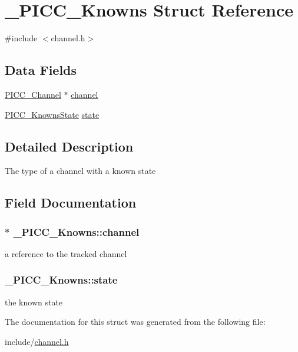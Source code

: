 \hypertarget{struct__PICC__Knowns}{\section{\-\_\-\-P\-I\-C\-C\-\_\-\-Knowns Struct Reference}
\label{struct__PICC__Knowns}
}


{\ttfamily \#include $<$channel.\-h$>$}

\subsection*{Data Fields}
{\bf }\par
\begin{DoxyCompactItemize}
\item 
\hyperlink{channel_8h_a0a70def8883f1abb8e7246b3a4c9dffb}{P\-I\-C\-C\-\_\-\-Channel} $\ast$ \hyperlink{struct__PICC__Knowns_a8e0180c667bb8d86d380fffa3473f66f}{channel}
\item 
\hyperlink{channel_8h_af0a907754143ea0a7261dccc8a9fa2db}{P\-I\-C\-C\-\_\-\-Knowns\-State} \hyperlink{struct__PICC__Knowns_add532920acff73cd540d3bf4e570f8cb}{state}
\end{DoxyCompactItemize}



\subsection{Detailed Description}
The type of a channel with a known state 

\subsection{Field Documentation}
\hypertarget{struct__PICC__Knowns_a8e0180c667bb8d86d380fffa3473f66f}{
\subsubsection[{channel}]{$\ast$ \-\_\-\-P\-I\-C\-C\-\_\-\-Knowns\-::channel}}\label{struct__PICC__Knowns_a8e0180c667bb8d86d380fffa3473f66f}
a reference to the tracked channel \hypertarget{struct__PICC__Knowns_add532920acff73cd540d3bf4e570f8cb}{
\subsubsection[{state}]{ \-\_\-\-P\-I\-C\-C\-\_\-\-Knowns\-::state}}\label{struct__PICC__Knowns_add532920acff73cd540d3bf4e570f8cb}
the known state 

The documentation for this struct was generated from the following file\-:\begin{DoxyCompactItemize}
\item 
include/\hyperlink{channel_8h}{channel.\-h}\end{DoxyCompactItemize}
